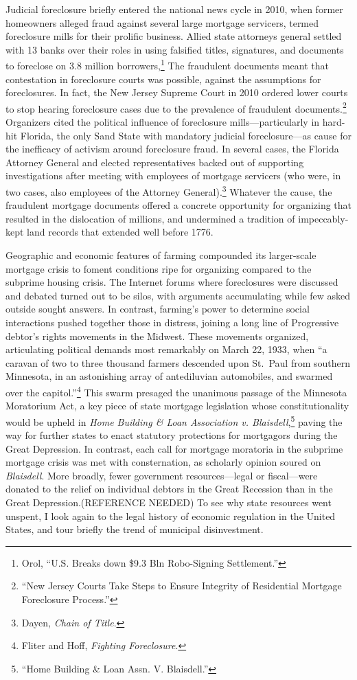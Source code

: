\documentclass[
]{article}
\let\rmarkdownfootnote\footnote%
\def\footnote{\protect\rmarkdownfootnote}
\begin{document}
Judicial foreclosure briefly entered the national news cycle in 2010,
when former homeowners alleged fraud against several large mortgage
servicers, termed foreclosure mills for their prolific business. Allied
state attorneys general settled with 13 banks over their roles in using
falsified titles, signatures, and documents to foreclose on 3.8 million
borrowers,\footnote{Orol, ``U.S. Breaks down \$9.3 Bln Robo-Signing
  Settlement.''} The fraudulent documents meant that contestation in
foreclosure courts was possible, against the assumptions for
foreclosures. In fact, the New Jersey Supreme Court in 2010 ordered
lower courts to stop hearing foreclosure cases due to the prevalence of
fraudulent documents.\footnote{``New Jersey Courts Take Steps to Ensure
  Integrity of Residential Mortgage Foreclosure Process.''} Organizers
cited the political influence of foreclosure mills---particularly in
hard-hit Florida, the only Sand State with mandatory judicial
foreclosure---as cause for the inefficacy of activism around foreclosure
fraud. In several cases, the Florida Attorney General and elected
representatives backed out of supporting investigations after meeting
with employees of mortgage servicers (who were, in two cases, also
employees of the Attorney General).\footnote{Dayen, \emph{Chain of
  Title}.} Whatever the cause, the fraudulent mortgage documents offered
a concrete opportunity for organizing that resulted in the dislocation
of millions, and undermined a tradition of impeccably-kept land records
that extended well before 1776.

Geographic and economic features of farming compounded its larger-scale
mortgage crisis to foment conditions ripe for organizing compared to the
subprime housing crisis. The Internet forums where foreclosures were
discussed and debated turned out to be silos, with arguments
accumulating while few asked outside sought answers. In contrast,
farming's power to determine social interactions pushed together those
in distress, joining a long line of Progressive debtor's rights
movements in the Midwest. These movements organized, articulating
political demands most remarkably on March 22, 1933, when ``a caravan of
two to three thousand farmers descended upon St.~Paul from southern
Minnesota, in an astonishing array of antediluvian automobiles, and
swarmed over the capitol.''\footnote{Fliter and Hoff, \emph{Fighting
  Foreclosure}.} This swarm presaged the unanimous passage of the
Minnesota Moratorium Act, a key piece of state mortgage legislation
whose constitutionality would be upheld in \emph{Home Building \& Loan
Association v. Blaisdell},\footnote{``Home Building \& Loan Assn. V.
  Blaisdell.''} paving the way for further states to enact statutory
protections for mortgagors during the Great Depression. In contrast,
each call for mortgage moratoria in the subprime mortgage crisis was met
with consternation, as scholarly opinion soured on \emph{Blaisdell}.
More broadly, fewer government resources---legal or fiscal---were
donated to the relief on individual debtors in the Great Recession than
in the Great Depression.(REFERENCE NEEDED) To see why state resources
went unspent, I look again to the legal history of economic regulation
in the United States, and tour briefly the trend of municipal
disinvestment.
\end{document}
